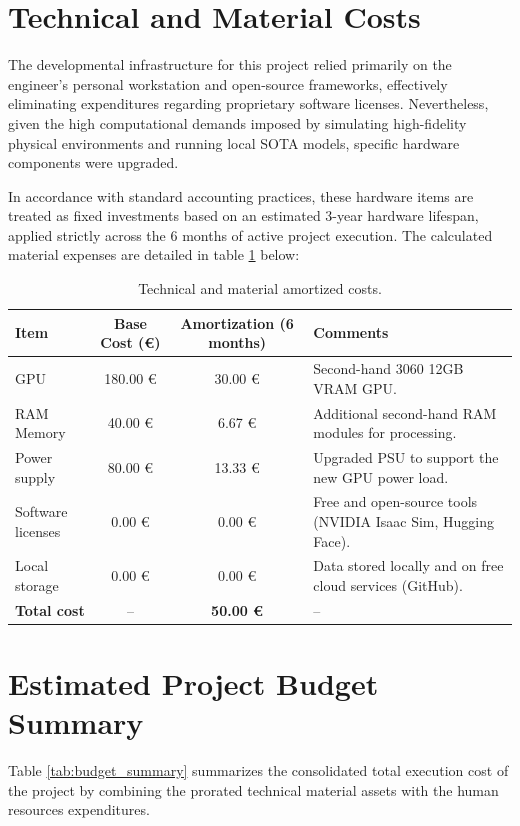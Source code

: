 \section{Technical and Material Costs}
The developmental infrastructure for this project relied primarily on the engineer's personal workstation and open-source frameworks, effectively eliminating expenditures regarding proprietary software licenses. Nevertheless, given the high computational demands imposed by simulating high-fidelity physical environments and running local SOTA models, specific hardware components were upgraded. 

In accordance with standard accounting practices, these hardware items are treated as fixed investments based on an estimated 3-year hardware lifespan, applied strictly across the 6 months of active project execution. The calculated material expenses are detailed in table \ref{tab:budget_materials} below:

\begin{table}[H]
	\centering
	\small
	\begin{tabularx}{\textwidth}{l c c X}
		\toprule
		\textbf{Item} & \textbf{Base Cost (€)} & \textbf{Amortization (6 months)} & \textbf{Comments} \\
		\midrule
		GPU & 180.00 € & 30.00 € & Second-hand 3060 12GB VRAM GPU. \\
		\midrule
		RAM Memory & 40.00 € & 6.67 € & Additional second-hand RAM modules for processing. \\
		\midrule
		Power supply & 80.00 € & 13.33 € & Upgraded PSU to support the new GPU power load. \\
		\midrule
		Software licenses & 0.00 € & 0.00 € & Free and open-source tools (NVIDIA Isaac Sim, Hugging Face). \\
		\midrule
		Local storage & 0.00 € & 0.00 € & Data stored locally and on free cloud services (GitHub). \\
		\midrule
		\textbf{Total cost} & -- & \textbf{50.00 €} & -- \\
		\bottomrule
	\end{tabularx}
	\caption{Technical and material amortized costs.}
	\label{tab:budget_materials}
\end{table}

\section{Estimated Project Budget Summary}
Table \ref{tab:budget_summary} summarizes the consolidated total execution cost of the project by combining the prorated technical material assets with the human resources expenditures.

